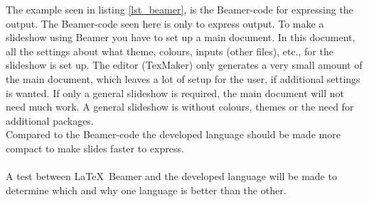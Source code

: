 The example seen in listing \ref{lst_beamer}, is the Beamer-code for expressing the output. The Beamer-code seen here is only to express output. To make a slideshow using Beamer you have to set up a main document. In this document, all the settings about what theme, colours, inputs (other files), etc., for the slideshow is set up. The editor (TexMaker) only generates a very small amount of the main document, which leaves a lot of setup for the user, if additional settings is wanted. If only a general slideshow is required, the main document will not need much work. A general slideshow is without colours, themes or the need for additional packages.\\
Compared to the Beamer-code the developed language should be made more compact to make slides faster to express.
\\ \\
A test between \LaTeX~Beamer and the developed language will be made to determine which and why one language is better than the other.
